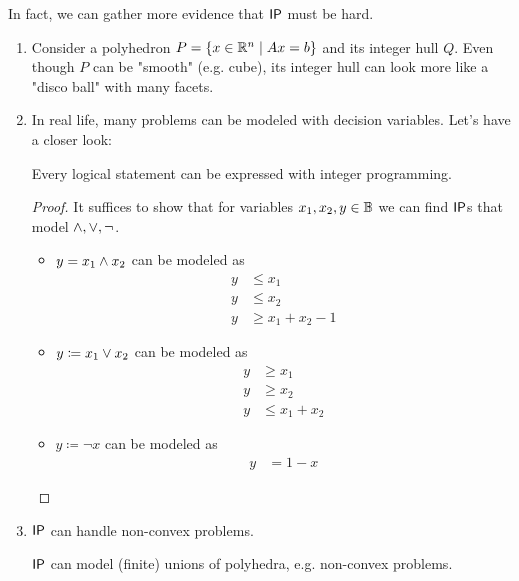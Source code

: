 In fact, we can gather more evidence that $\mathsf{IP}$ must be hard.
\begin{enumerate}
    \item Consider a polyhedron $P = \{x \in \mathbb{R}^n \mid Ax=b\}$ and its integer hull $Q$.
          Even though $P$ can be "smooth" (e.g. cube), its integer hull can look more like a "disco ball" with many facets.
    \item In real life, many problems can be modeled with decision variables. Let's have a closer look:
          \begin{theorem}
              Every logical statement can be expressed with integer programming.
          \end{theorem}
          \begin{proof}
              It suffices to show that for variables $x_1,x_2,y \in \mathbb{B}$ we can find $\mathsf{IP}$s that model $\wedge, \vee, \neg$.
              \begin{itemize}
                  \item $y = x_1 \wedge x_2$ can be modeled as
                        \begin{align*}
                            y & \leq x_1           \\
                            y & \leq x_2           \\
                            y & \geq x_1 + x_2 - 1
                        \end{align*}
                  \item $y \coloneqq x_1 \vee x_2$ can be modeled as
                        \begin{align*}
                            y & \geq x_1       \\
                            y & \geq x_2       \\
                            y & \leq x_1 + x_2
                        \end{align*}
                  \item $y \coloneqq \neg x$ can be modeled as
                        \begin{align*}
                            y & = 1- x
                        \end{align*}
              \end{itemize}
          \end{proof}
    \item $\mathsf{IP}$ can handle non-convex problems.
          \begin{theorem}
              $\mathsf{IP}$ can model (finite) unions of polyhedra, e.g. non-convex problems.

\end{theorem}
\end{enumerate}
